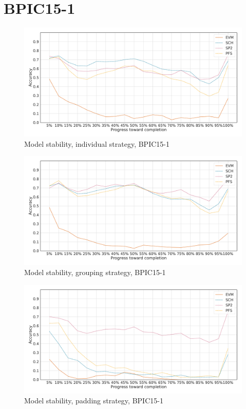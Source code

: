 \section*{BPIC15-1}
\begin{figure}[!htb]
    \centering
    \includegraphics[width=\textwidth]{gfx/bpic2015_1/individual_stability.pdf}
    \caption{Model stability, individual strategy, BPIC15-1}
    \label{fig:bpic15-1-individual-stability}
\end{figure}
\begin{figure}[!htb]
    \centering
    \includegraphics[width=\textwidth]{gfx/bpic2015_1/grouped_stability.pdf}
    \caption{Model stability, grouping strategy, BPIC15-1}
    \label{fig:bpic15-1-grouped-stability}
\end{figure}
\begin{figure}[!htb]
    \centering
    \includegraphics[width=\textwidth]{gfx/bpic2015_1/padded_stability.pdf}
    \caption{Model stability, padding strategy, BPIC15-1}
    \label{fig:bpic15-1-padded-stability}
\end{figure}
